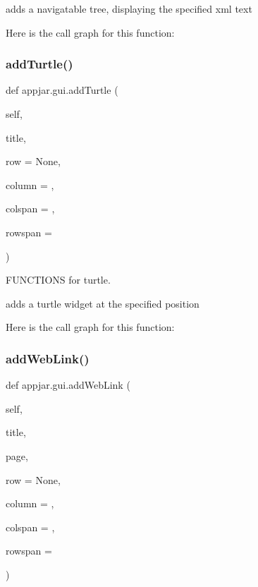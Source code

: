 \begin{DoxyVerb}adds a navigatable tree, displaying the specified xml text \end{DoxyVerb}
 Here is the call graph for this function\+:
\mbox{\label{classappjar_1_1gui_a9ec18e34756f48bef27de30a349cb078}} 
\subsubsection{\texorpdfstring{add\+Turtle()}{addTurtle()}}
{\footnotesize\ttfamily def appjar.\+gui.\+add\+Turtle (\begin{DoxyParamCaption}\item[{}]{self,  }\item[{}]{title,  }\item[{}]{row = {\ttfamily None},  }\item[{}]{column = {},  }\item[{}]{colspan = {},  }\item[{}]{rowspan = {} }\end{DoxyParamCaption})}



F\+U\+N\+C\+T\+I\+O\+NS for turtle. 

\begin{DoxyVerb}adds a turtle widget at the specified position \end{DoxyVerb}
 Here is the call graph for this function\+:
\mbox{\label{classappjar_1_1gui_abf8c81f557be8bf534155e768c29ece2}} 
\subsubsection{\texorpdfstring{add\+Web\+Link()}{addWebLink()}}
{\footnotesize\ttfamily def appjar.\+gui.\+add\+Web\+Link (\begin{DoxyParamCaption}\item[{}]{self,  }\item[{}]{title,  }\item[{}]{page,  }\item[{}]{row = {\ttfamily None},  }\item[{}]{column = {},  }\item[{}]{colspan = {},  }\item[{}]{rowspan = {} }\end{DoxyParamCaption})}

